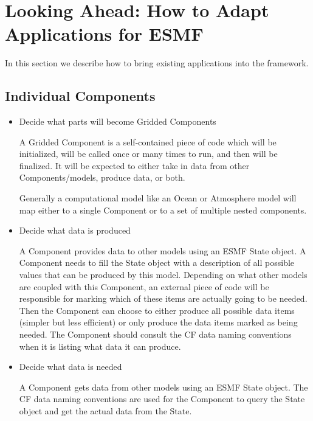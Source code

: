 
\section{Looking Ahead:  How to Adapt Applications for ESMF}
\label{sec:Adoption}

In this section we describe how to bring existing applications into the framework.

\subsection{Individual Components}

\begin{itemize}

\item Decide what parts will become Gridded Components 

A Gridded Component is a self-contained
piece of code which will be initialized, will be called once or many times
to run, and then will be finalized.  It will be expected to either take in
data from other Components/models, produce data, or both.

Generally a computational model like an Ocean or Atmosphere model will
map either to a single Component or to a set of multiple nested
components.

\item Decide what data is produced 

A Component provides data to other models using an ESMF State
object.  A Component needs to fill the State object with a description of
all possible values that can be produced by this model.  Depending on what
other models are coupled with this Component, an external piece of code
will be responsible for marking which of these items are actually going to
be needed.  Then the Component can choose to either produce all possible
data items (simpler but less efficient) or only produce the data items
marked as being needed.  The Component should consult the CF data naming
conventions when it is listing what data it can produce.

\item Decide what data is needed 

A Component gets data from other models using an ESMF State object.
The CF data naming conventions are used for the Component to query
the State object and get the actual data from the State.


\end{itemize}
